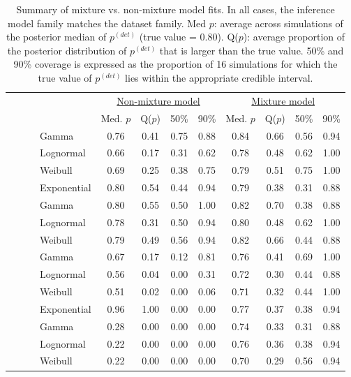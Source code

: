 \documentclass[12pt]{article}
\newcommand{\pdet}{p^{(det)}}
\begin{document}
\begin{table}[ht]\centering\small
\begin{tabular}{l|l|l|l|cccc|cccc}
 \multicolumn{4}{c|}{ } & \multicolumn{4}{c|}{\underline{Non-mixture model}} & \multicolumn{4}{c}{\underline{Mixture model}} \\
 \multicolumn{4}{c|}{ } & Med. $p$ & Q($p$) & 50\% & 90\% & Med. $p$ & Q($p$) & 50\% & 90\% \\ 
  \hline
  \hline
 \parbox[t]{2mm}{} & \parbox[t]{2mm}{} & \parbox[t]{2mm}{} & Gamma & 0.76 & 0.41 & 0.75 & 0.88 & 0.84 & 0.66 & 0.56 & 0.94 \\ 
 & & &   Lognormal & 0.66 & 0.17 & 0.31 & 0.62 & 0.78 & 0.48 & 0.62 & 1.00  \\ 
 & & &   Weibull & 0.69 & 0.25 & 0.38 & 0.75 & 0.79 & 0.51 & 0.75 & 1.00 \\ 
 & & &   Exponential & 0.80 & 0.54 & 0.44 & 0.94 & 0.79 & 0.38 & 0.31 & 0.88  \\ 
 & & \parbox[t]{2mm}{} &  Gamma & 0.80 & 0.55 & 0.50 & 1.00 & 0.82 & 0.70 & 0.38 & 0.88 \\ 
 & & &   Lognormal & 0.78 & 0.31 & 0.50 & 0.94 & 0.80 & 0.48 & 0.62 & 1.00 \\ 
 & & &   Weibull & 0.79 & 0.49 & 0.56 & 0.94 & 0.82 & 0.66 & 0.44 & 0.88 \\ 
& \parbox[t]{2mm}{} & \parbox[t]{2mm}{} & Gamma & 0.67 & 0.17 & 0.12 & 0.81 & 0.76 & 0.41 & 0.69 & 1.00 \\ 
 & & &   Lognormal & 0.56 & 0.04 & 0.00 & 0.31 & 0.72 & 0.30 & 0.44 & 0.88 \\ 
 & & &   Weibull & 0.51 & 0.02 & 0.00 & 0.06 & 0.71 & 0.32 & 0.44 & 1.00 \\ 
 & & &   Exponential & 0.96 & 1.00 & 0.00 & 0.00 & 0.77 & 0.37 & 0.38 & 0.94 \\ 
 & & \parbox[t]{2mm}{} & Gamma & 0.28 & 0.00 & 0.00 & 0.00 & 0.74 & 0.33 & 0.31 & 0.88 \\ 
 & & &   Lognormal & 0.22 & 0.00 & 0.00 & 0.00 & 0.76 & 0.36 & 0.38 & 0.94 \\ 
 & & &   Weibull & 0.22 & 0.00 & 0.00 & 0.00 & 0.70 & 0.29 & 0.56 & 0.94 \\ 
   \hline
\end{tabular}
\caption{Summary of mixture vs. non-mixture model fits.  
In all cases, the inference model family matches the dataset family.  
Med $p$: average across simulations of the posterior median of $\pdet$ (true value = 0.80).  
Q($p$): average proportion of the posterior distribution of $\pdet$ that is larger than the true value.  
50\% and 90\% coverage is expressed as the proportion of 16 simulations for which the true value of $\pdet$ lies within the appropriate credible interval.  
}
\label{tbl:sim1}
\end{table}
\fi
\end{document}
